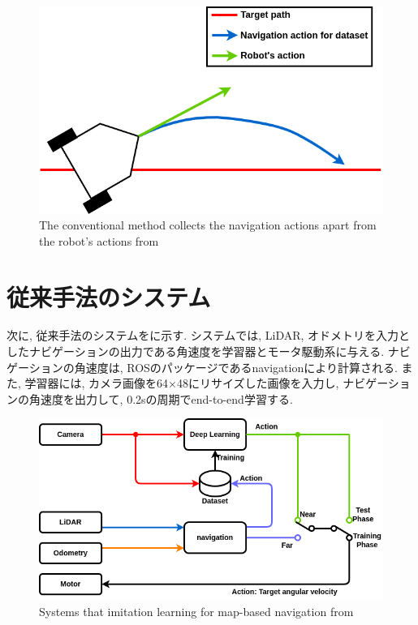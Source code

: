 \newpage
\begin{figure}[h]
  \centering
  \includegraphics[keepaspectratio, scale=0.4]{images/old-method3.png}
  \caption{The conventional method collects the navigation actions apart from the robot's actions from \cite{okada-si2020}}
  \label{Fig:old-method3}
  \end{figure}

\newpage
\section{従来手法のシステム}
次に, 従来手法のシステムをに示す. システムでは, LiDAR, オドメトリを入力としたナビゲーションの出力である角速度を学習器とモータ駆動系に与える. ナビゲーションの角速度は, ROSのパッケージであるnavigation\cite{navigation}により計算される. また, 学習器には, カメラ画像を64×48にリサイズした画像を入力し, ナビゲーションの角速度を出力して, 0.2sの周期でend-to-end学習する. 

\vspace{10mm}
\begin{figure}[h]
  \centering
  \includegraphics[keepaspectratio, scale=0.45]
  {images/okada-method.png}
  \caption{Systems that imitation learning for map-based navigation from \cite{okada-si2021}}
  \label{Fig:okada-method}
  \end{figure}

